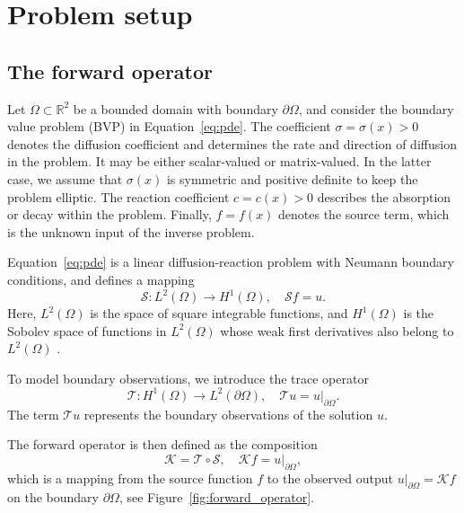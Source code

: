 \section{Problem setup}
\label{sec:setup}


\subsection{The forward operator}

Let $\Omega \subset \mathbb R^2$ be a bounded domain with boundary $\partial \Omega$, and consider the boundary value problem (BVP) in Equation~\eqref{eq:pde}. The coefficient $\sigma = \sigma(x) > 0$ denotes the diffusion coefficient and determines the rate and direction of diffusion in the problem. It may be either scalar-valued or matrix-valued. In the latter case, we assume that $\sigma(x)$ is symmetric and positive definite to keep the problem elliptic. The reaction coefficient $c = c(x) > 0$ describes the absorption or decay within the problem. Finally, $f = f(x)$ denotes the source term, which is the unknown input of the inverse problem.

Equation~\eqref{eq:pde} is a linear diffusion-reaction problem with Neumann boundary conditions, and defines a mapping
\begin{equation}\label{eq:S_cont}
    \mathcal S: L^2(\Omega) \rightarrow H^1(\Omega), \quad \mathcal{S} f = u.
\end{equation}
Here, $L^2(\Omega)$ is the space of square integrable functions, and $H^1(\Omega)$ is the Sobolev space of functions in $L^2(\Omega)$ whose weak first derivatives also belong to $L^2(\Omega)$ \cite{quarteroniNumericalModelsDifferential2014}.

To model boundary observations, we introduce the trace operator
\begin{equation}\label{eq:trace}
    \mathcal T: H^1(\Omega) \rightarrow L^2(\partial\Omega), \quad \mathcal{T} u = u|_{\partial\Omega}.
\end{equation}
The term $\mathcal{T} u$ represents the boundary observations of the solution $u$.

The forward operator is then defined as the composition
\begin{equation}\label{eq:K}
    \mathcal K = \mathcal T \circ \mathcal S, \quad \mathcal{K} f = u|_{\partial\Omega},
\end{equation}
which is a mapping from the source function $f$ to the observed output $u|_{\partial\Omega} = \mathcal K f$ on the boundary $\partial \Omega$, see Figure~\ref{fig:forward_operator}.

